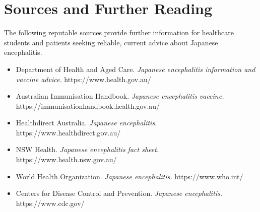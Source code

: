 \section*{Sources and Further Reading}
The following reputable sources provide further information for healthcare students and patients seeking reliable, current advice about Japanese encephalitis.
\begin{itemize}
    \item Department of Health and Aged Care. \textit{Japanese encephalitis information and vaccine advice.} https://www.health.gov.au/
    \item Australian Immunisation Handbook. \textit{Japanese encephalitis vaccine.} https://immunisationhandbook.health.gov.au/
    \item Healthdirect Australia. \textit{Japanese encephalitis.} https://www.healthdirect.gov.au/
    \item NSW Health. \textit{Japanese encephalitis fact sheet.} https://www.health.nsw.gov.au/
    \item World Health Organization. \textit{Japanese encephalitis.} https://www.who.int/
    \item Centers for Disease Control and Prevention. \textit{Japanese encephalitis.} https://www.cdc.gov/
\end{itemize}
